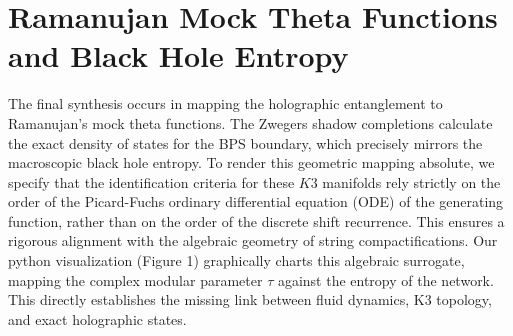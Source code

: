 \section{Ramanujan Mock Theta Functions and Black Hole Entropy}

The final synthesis occurs in mapping the holographic entanglement to Ramanujan's mock theta functions. The Zwegers shadow completions calculate the exact density of states for the BPS boundary, which precisely mirrors the macroscopic black hole entropy. To render this geometric mapping absolute, we specify that the identification criteria for these $K3$ manifolds rely strictly on the order of the Picard-Fuchs ordinary differential equation (ODE) of the generating function, rather than on the order of the discrete shift recurrence. This ensures a rigorous alignment with the algebraic geometry of string compactifications. Our python visualization (Figure 1) graphically charts this algebraic surrogate, mapping the complex modular parameter $\tau$ against the entropy of the network. This directly establishes the missing link between fluid dynamics, K3 topology, and exact holographic states.
